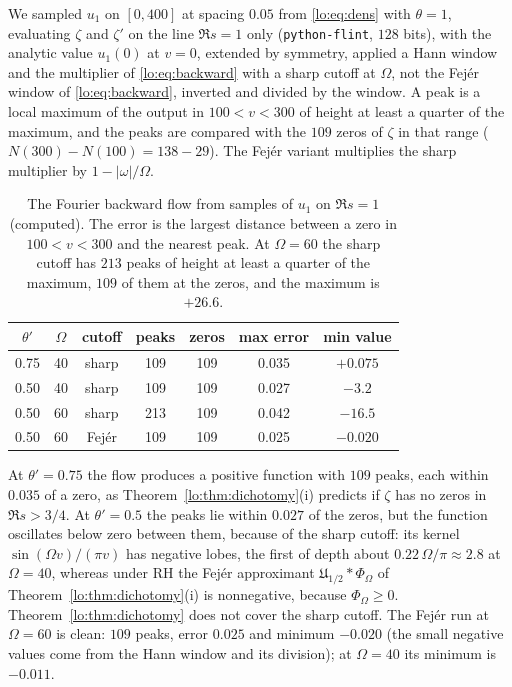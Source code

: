 We sampled $u_1$ on $[0,400]$ at spacing $0.05$ from \eqref{lo:eq:dens} with $\theta=1$, evaluating $\zeta$ and $\zeta'$ on the line $\Re s=1$ only (\texttt{python-flint}, $128$ bits), with the analytic value $u_1(0)$ at $v=0$, extended by symmetry, applied a Hann window and the multiplier of \eqref{lo:eq:backward} with a sharp cutoff at $\Omega$, not the Fej\'er window of \eqref{lo:eq:backward}, inverted and divided by the window. A peak is a local maximum of the output in $100<v<300$ of height at least a quarter of the maximum, and the peaks are compared with the $109$ zeros of $\zeta$ in that range ($N(300)-N(100)=138-29$). The Fej\'er variant multiplies the sharp multiplier by $1-|\omega|/\Omega$.

\begin{table}[ht]
\centering
\small
\begin{tabular}{ccccccc}
\toprule
$\theta'$ & $\Omega$ & cutoff & peaks & zeros & max error & min value\\
\midrule
0.75 & 40 & sharp & 109 & 109 & 0.035 & $+0.075$\\
0.50 & 40 & sharp & 109 & 109 & 0.027 & $-3.2$\\
0.50 & 60 & sharp & 213 & 109 & 0.042 & $-16.5$\\
0.50 & 60 & Fej\'er & 109 & 109 & 0.025 & $-0.020$\\
\bottomrule
\end{tabular}
\caption{The Fourier backward flow from samples of $u_1$ on $\Re s=1$ (computed). The error is the largest distance between a zero in $100<v<300$ and the nearest peak. At $\Omega=60$ the sharp cutoff has $213$ peaks of height at least a quarter of the maximum, $109$ of them at the zeros, and the maximum is $+26.6$.}\label{lo:tab:flow}
\end{table}

\begin{resultpar}\label{lo:res:flow}At $\theta'=0.75$ the flow produces a positive function with $109$ peaks, each within $0.035$ of a zero, as Theorem~\ref{lo:thm:dichotomy}(i) predicts if $\zeta$ has no zeros in $\Re s>3/4$. At $\theta'=0.5$ the peaks lie within $0.027$ of the zeros, but the function oscillates below zero between them, because of the sharp cutoff: its kernel $\sin(\Omega v)/(\pi v)$ has negative lobes, the first of depth about $0.22\,\Omega/\pi\approx2.8$ at $\Omega=40$, whereas under RH the Fej\'er approximant $\mathfrak U_{1/2}*\Phi_\Omega$ of Theorem~\ref{lo:thm:dichotomy}(i) is nonnegative, because $\Phi_\Omega\ge0$. Theorem~\ref{lo:thm:dichotomy} does not cover the sharp cutoff. The Fej\'er run at $\Omega=60$ is clean: $109$ peaks, error $0.025$ and minimum $-0.020$ (the small negative values come from the Hann window and its division); at $\Omega=40$ its minimum is $-0.011$.\end{resultpar}


